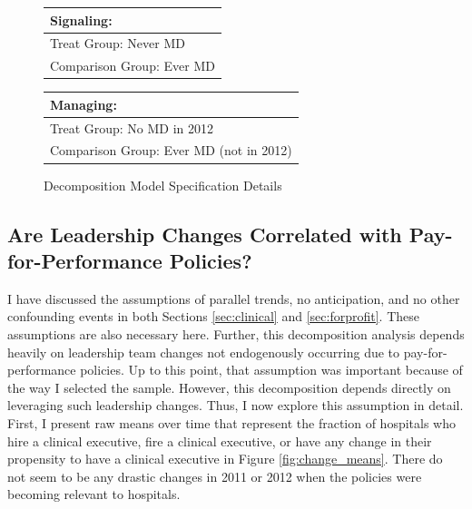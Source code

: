 \documentclass[12pt]{article}
\begin{document}
\begin{figure}[ht!]
\begin{center}
\caption{\label{fig:decomp_spec}Decomposition Model Specification Details}
 
 \begin{tabular}{| m{18em} |}
 \hline
 Signaling:\\ [0.5ex]
 \hline\hline 
 \vspace{2mm}
 Treat Group:  \hspace{15mm} Never MD \\
 \vspace{2mm}
 Comparison Group: \hspace{3mm} Ever MD  \\
 [1ex]
 \hline
 \end{tabular}
\hfil   %
 \begin{tabular}{|m{18em}|}
 \hline
 Managing:\\ [0.5ex]
 \hline\hline
 \vspace{2mm}
 Treat Group: \hspace{11mm} No MD in 2012 \\
 \vspace{2mm}
 Comparison Group:  Ever MD (not in 2012)  \\
 [1ex]
 \hline
 \end{tabular}
 
\end{center}
 \end{figure}

    \subsection{Are Leadership Changes Correlated with Pay-for-Performance Policies?} \label{sec:changes}

    I have discussed the assumptions of parallel trends, no anticipation, and no other confounding events in both Sections \ref{sec:clinical} and \ref{sec:forprofit}. These assumptions are also necessary here. Further, this decomposition analysis depends heavily on leadership team changes not endogenously occurring due to pay-for-performance policies. Up to this point, that assumption was important because of the way I selected the sample. However, this decomposition depends directly on leveraging such leadership changes. Thus, I now explore this assumption in detail. First, I present raw means over time that represent the fraction of hospitals who hire a clinical executive, fire a clinical executive, or have any change in their propensity to have a clinical executive in Figure \ref{fig:change_means}. There do not seem to be any drastic changes in 2011 or 2012 when the policies were becoming relevant to hospitals. 
\end{document}
